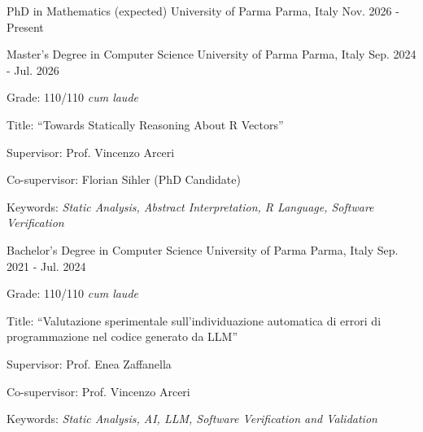 
\begin{cventries}

  \cventry
  {PhD in Mathematics (expected)} %
  {University of Parma} %
  {Parma, Italy} %
  {Nov. 2026 - Present} %
  {}

  \cventry
  {Master's Degree in Computer Science} %
  {University of Parma} %
  {Parma, Italy} %
  {Sep. 2024 - Jul. 2026} %
  {
    \begin{cvitems-no-bullet} %
    \item {Grade: 110/110 \emph{cum laude}}
    \item {Title: \textquotedblleft{Towards Statically Reasoning
      About R Vectors}\textquotedblright}
    \item {Supervisor: Prof. Vincenzo Arceri}
    \item {Co-supervisor: Florian Sihler (PhD Candidate)}
    \item {Keywords: \emph{Static Analysis, Abstract Interpretation,
      R Language, Software Verification}}
    \end{cvitems-no-bullet}
  }

  \cventry
  {Bachelor's Degree in Computer Science} %
  {University of Parma} %
  {Parma, Italy} %
  {Sep. 2021 - Jul. 2024} %
  {
    \begin{cvitems-no-bullet} %
    \item {Grade: 110/110 \emph{cum laude}}
    \item {Title: \textquotedblleft{Valutazione sperimentale
          sull’individuazione automatica di errori di programmazione nel
      codice generato da LLM}\textquotedblright}
    \item {Supervisor: Prof. Enea Zaffanella}
    \item {Co-supervisor: Prof. Vincenzo Arceri}
    \item {Keywords: \emph{Static Analysis, AI, LLM, Software
      Verification and Validation}}
    \end{cvitems-no-bullet}
  }

\end{cventries}
